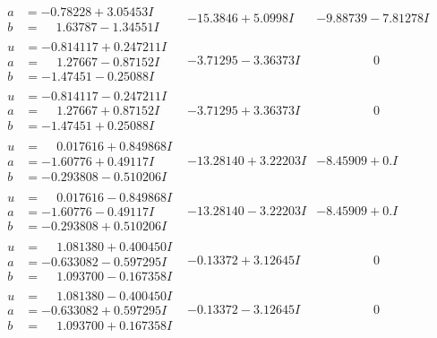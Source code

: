 \documentclass[1p]{elsarticle_modified}
\theoremstyle{definition}
\begin{document}
$$\begin{array}{c|c|c}
\begin{aligned}
a &= -0.78228 + 3.05453 I \\
b &= \phantom{-}1.63787 - 1.34551 I\end{aligned}
 & -15.3846 + 5.0998 I & -9.88739 - 7.81278 I \\ \hline\begin{aligned}
u &= -0.814117 + 0.247211 I \\
a &= \phantom{-}1.27667 - 0.87152 I \\
b &= -1.47451 - 0.25088 I\end{aligned}
 & -3.71295 - 3.36373 I & \phantom{-0.000000 } 0 \\ \hline\begin{aligned}
u &= -0.814117 - 0.247211 I \\
a &= \phantom{-}1.27667 + 0.87152 I \\
b &= -1.47451 + 0.25088 I\end{aligned}
 & -3.71295 + 3.36373 I & \phantom{-0.000000 } 0 \\ \hline\begin{aligned}
u &= \phantom{-}0.017616 + 0.849868 I \\
a &= -1.60776 + 0.49117 I \\
b &= -0.293808 - 0.510206 I\end{aligned}
 & -13.28140 + 3.22203 I & -8.45909 + 0. I\phantom{ +0.000000I} \\ \hline\begin{aligned}
u &= \phantom{-}0.017616 - 0.849868 I \\
a &= -1.60776 - 0.49117 I \\
b &= -0.293808 + 0.510206 I\end{aligned}
 & -13.28140 - 3.22203 I & -8.45909 + 0. I\phantom{ +0.000000I} \\ \hline\begin{aligned}
u &= \phantom{-}1.081380 + 0.400450 I \\
a &= -0.633082 - 0.597295 I \\
b &= \phantom{-}1.093700 - 0.167358 I\end{aligned}
 & -0.13372 + 3.12645 I & \phantom{-0.000000 } 0 \\ \hline\begin{aligned}
u &= \phantom{-}1.081380 - 0.400450 I \\
a &= -0.633082 + 0.597295 I \\
b &= \phantom{-}1.093700 + 0.167358 I\end{aligned}
 & -0.13372 - 3.12645 I & \phantom{-0.000000 } 0 \\ \hline\begin{aligned}

\end{aligned}
\end{array}$$
\end{document}
